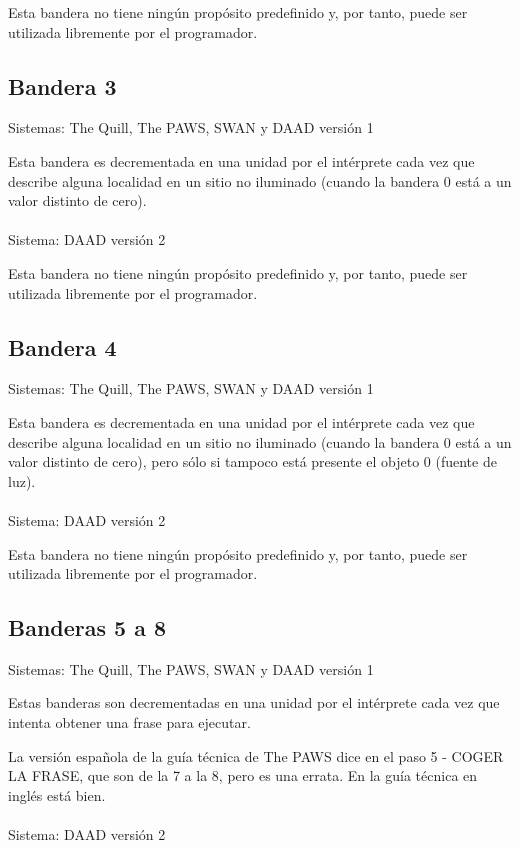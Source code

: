 \documentclass[11pt, a5paper]{article}
\newcommand{\quill}{\textsf{The Quill}\xspace}
\newcommand{\paw}{\textsf{The PAWS}\xspace}
\newcommand{\swan}{\textsf{SWAN}\xspace}
\newcommand{\daad}{\textsf{DAAD}\xspace}
\newcommand{\sistema}[1]{\noindent Sistema: #1 \nopagebreak}
\newcommand{\sistemas}[1]{\noindent Sistemas: #1 \nopagebreak}
\begin{document}
Esta bandera no tiene ningún propósito predefinido y, por tanto, puede ser utilizada libremente por el programador.

\subsection{Bandera 3}

\sistemas{\quill, \paw, \swan y \daad versión 1}

Esta bandera es decrementada en una unidad por el intérprete cada vez que describe alguna localidad en un sitio no iluminado (cuando la bandera 0 está a un valor distinto de cero).
\\\ \\
\sistema{\daad versión 2}

Esta bandera no tiene ningún propósito predefinido y, por tanto, puede ser utilizada libremente por el programador.

\subsection{Bandera 4}

\sistemas{\quill, \paw, \swan y \daad versión 1}

Esta bandera es decrementada en una unidad por el intérprete cada vez que describe alguna localidad en un sitio no iluminado (cuando la bandera 0 está a un valor distinto de cero), pero sólo si tampoco está presente el objeto 0 (fuente de luz).
\\\ \\
\sistema{\daad versión 2}

Esta bandera no tiene ningún propósito predefinido y, por tanto, puede ser utilizada libremente por el programador.

\subsection{Banderas 5 a 8}

\sistemas{\quill, \paw, \swan y \daad versión 1}

Estas banderas son decrementadas en una unidad por el intérprete cada vez que intenta obtener una frase para ejecutar.

La versión española de la guía técnica de \paw dice en el paso 5 - COGER LA FRASE, que son de la 7 a la 8, pero es una errata. En la guía técnica en inglés \cite{PawsPC} está bien.
\\\ \\
\sistema{\daad versión 2}
\end{document}
